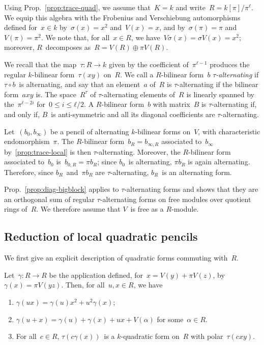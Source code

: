 \documentclass{lms}
\begin{document}
Using Prop.~\ref{prop:trace-quad},
we assume that~$K = k$ and write~$R = k[π] / π^ℓ$.
We equip this algebra with the Frobenius and Verschiebung automorphisms
defined for~$x ∈ k$ by~$σ(x) = x^2$ and~$V(x) = x$,
and by~$σ(π) = π$ and~$V(π) = π^2$.
We note that, for all~$x ∈ R$, we have~$V σ(x) = σ V(x) = x^2$;
moreover, $R$~decomposes as~$R = V(R) ⊕ π V(R)$.

We recall that the map~$τ: R → k$ given by the coefficient of~$π^{ℓ-1}$
produces the regular $k$-bilinear form~$τ(x y)$ on~$R$.
We call a $R$-bilinear form~$b$ \emph{$τ$-alternating} if $τ ∘ b$~is
alternating, and say that an element~$a$ of~$R$ is $τ$-alternating if the
bilinear form~$a x y$ is.
The space~$R^{τ}$ of $τ$-alternating elements of~$R$ is linearly spanned
by the~$π^{ℓ-2i}$ for~$0 ≤ i ≤ ℓ/2$.
A $R$-bilinear form~$b$ with matrix~$B$ is $τ$-alternating if, and only if,
$B$~is anti-symmetric and all its diagonal coefficients are $τ$-alternating.

Let~$(b_0, b_{∞})$ be a pencil of alternating $k$-bilinear forms on~$V$,
with characteristic endomorphism~$π$. The $R$-bilinear form~$b_R = b_{∞,
R}$ associated to~$b_{∞}$ by~\ref{prop:trace-local} is then
$τ$-alternating. Moreover, the $R$-bilinear form associated to~$b_{0}$
is~$b_{0, R} = π b_R$; since $b_{0}$~is alternating, $π b_R$ is again
alternating. Therefore, since $b_R$~and~$π b_R$ are $τ$-alternating,
$b_R$~is an alternating form.

Prop.~\ref{prop:diag-bigblock} applies to $τ$-alternating forms and shows
that they are an orthogonal sum of regular $τ$-alternating forms on free
modules over quotient rings of~$R$. We therefore assume that $V$~is free
as a $R$-module.

\subsection{Reduction of local quadratic pencils}

We first give an explicit description of quadratic forms commuting
with~$R$.

\begin{lem}\label{lem:gamma-polar}
Let~$γ: R → R$ be the application defined, for~$x = V(y) + π V(z)$,
by~$γ(x) = π V(yz)$. Then, for all~$u, x ∈ R$, we have
\begin{enumerate}
\item $γ(ux) = γ(u) x^2 + u^2 γ(x)$;
\item $γ(u+x) = γ(u) + γ(x) + ux + V(α)$ for some~$α ∈ R$.
\item For all~$c ∈ R$, $τ(c γ (x))$~is a $k$-quadratic form on~$R$
with polar~$τ(c x y)$.
\end{enumerate}
\end{lem}
\end{document}
